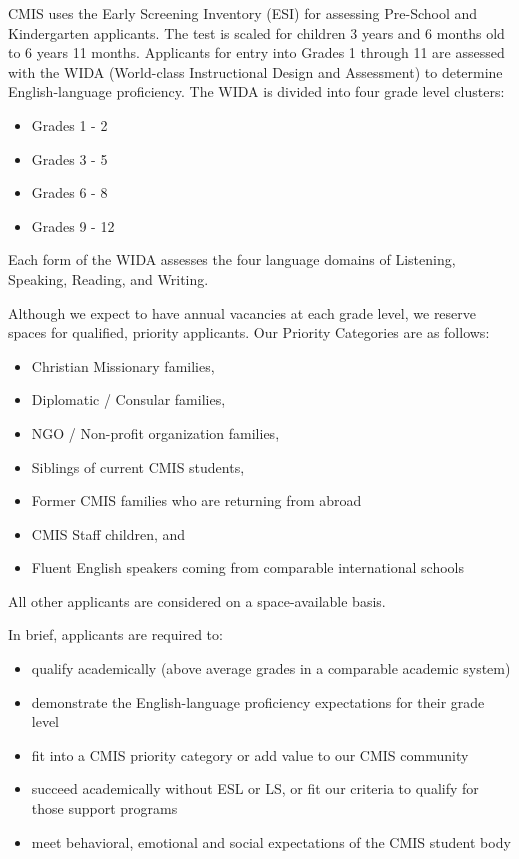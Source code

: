 
CMIS uses the Early Screening Inventory (ESI) for assessing Pre-School and Kindergarten applicants.  The test is scaled for children 3 years and 6 months old to 6 years 11 months.  Applicants for entry into Grades 1 through 11 are assessed with the WIDA (World-class Instructional Design and Assessment) to determine English-language proficiency.  The WIDA is divided into four grade level clusters:

\begin{itemize}
\item Grades 1 - 2
\item Grades 3 - 5
\item Grades 6 - 8
\item Grades 9 - 12
\end{itemize}


Each form of the WIDA assesses the four language domains of Listening, Speaking, Reading, and Writing.  


Although we expect to have annual vacancies at each grade level, we reserve spaces for qualified, priority applicants.  Our Priority Categories are as follows:  
\begin{itemize}
\item Christian Missionary families,
\item Diplomatic / Consular families,
\item NGO / Non-profit organization families,
\item Siblings of current CMIS students,
\item Former CMIS families who are returning from abroad
\item CMIS Staff children, and
\item Fluent English speakers coming from comparable international schools
\end{itemize}

All other applicants are considered on a space-available basis.

In brief, applicants are required to:

\begin{itemize}
\item qualify academically (above average grades in a comparable academic system)
\item demonstrate the English-language proficiency expectations for their grade level
\item fit into a CMIS priority category or add value to our CMIS community
\item succeed academically without ESL or LS, or fit our criteria to qualify for those support programs
\item meet behavioral, emotional and social expectations of the CMIS student body
\end{itemize}

